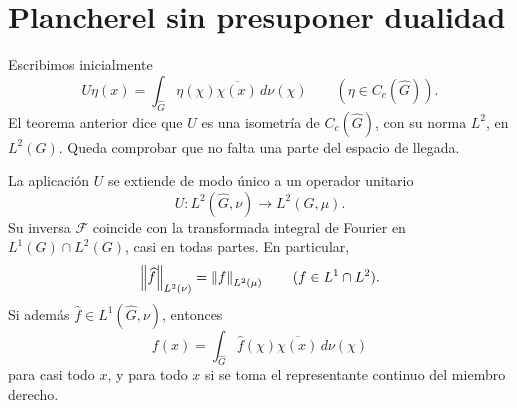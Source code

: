 \section{Plancherel sin presuponer dualidad}
Escribimos inicialmente
\[
 U\eta(x)=\int_{\widehat G}\eta(\chi)\overline{\chi(x)}\,d\nu(\chi)
 \qquad(\eta\in C_c(\widehat G)).
\]
El teorema anterior dice que $U$ es una isometría de $C_c(\widehat G)$, con su norma $L^2$, en $L^2(G)$. Queda comprobar que no falta una parte del espacio de llegada.

\begin{teorema}\label{v4:plancherel-lca}
La aplicación $U$ se extiende de modo único a un operador unitario
\[
 U:L^2(\widehat G,\nu)\longrightarrow L^2(G,\mu).
\]
Su inversa $\mathcal F$ coincide con la transformada integral de Fourier en $L^1(G)\cap L^2(G)$, casi en todas partes. En particular,
\[
 \left\lVert\widehat f\right\rVert_{L^2(\nu)}=\left\lVert f\right\rVert_{L^2(\mu)}
 \qquad(f\in L^1\cap L^2).
\]
Si además $\widehat f\in L^1(\widehat G,\nu)$, entonces
\[
 f(x)=\int_{\widehat G}\widehat f(\chi)\overline{\chi(x)}\,d\nu(\chi)
\]
para casi todo $x$, y para todo $x$ si se toma el representante continuo del miembro derecho.
\end{teorema}

